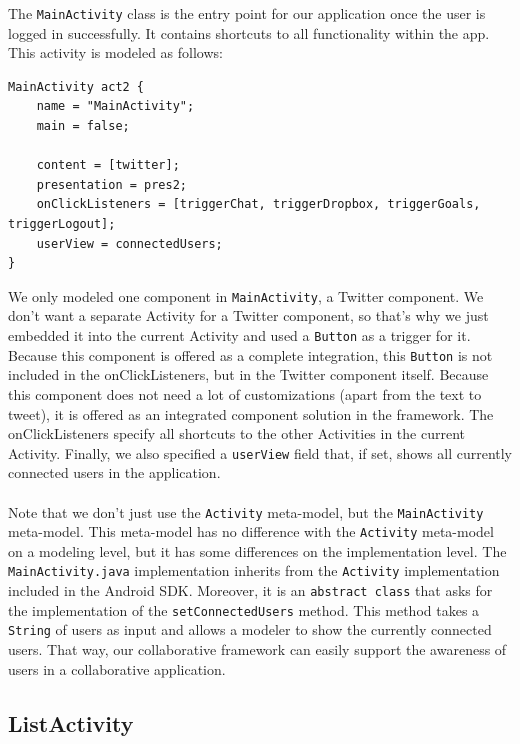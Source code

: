 The \texttt{MainActivity} class is the entry point for our application once the user is logged in successfully. It contains shortcuts to all functionality within the app. This activity is modeled as follows:

\begin{lstlisting}[label=main-model,caption=MainActivity model, captionpos=t]
MainActivity act2 {
	name = "MainActivity";
	main = false;

	content = [twitter];
	presentation = pres2;
	onClickListeners = [triggerChat, triggerDropbox, triggerGoals, triggerLogout];
	userView = connectedUsers;
}
\end{lstlisting}
We only modeled one component in \texttt{MainActivity}, a Twitter component. We don't want a separate Activity for a Twitter component, so that's why we just embedded it into the current Activity and used a \texttt{Button} as a trigger for it. Because this component is offered as a complete integration, this \texttt{Button} is not included in the onClickListeners, but in the Twitter component itself. Because this component does not need a lot of customizations (apart from the text to tweet), it is offered as an integrated component solution in the framework. The onClickListeners specify all shortcuts to the other Activities in the current Activity. Finally, we also specified a \texttt{userView} field that, if set, shows all currently connected users in the application. \\ \\
Note that we don't just use the \texttt{Activity} meta-model, but the \texttt{MainActivity} meta-model. This meta-model has no difference with the \texttt{Activity} meta-model on a modeling level, but it has some differences on the implementation level. The \texttt{MainActivity.java} implementation inherits from the \texttt{Activity} implementation included in the Android SDK. Moreover, it is an \texttt{abstract class} that asks for the implementation of the \texttt{setConnectedUsers} method. This method takes a \texttt{String} of users as input and allows a modeler to show the currently connected users. That way, our collaborative framework can easily support the awareness of users in a collaborative application.

\subsection{ListActivity}

